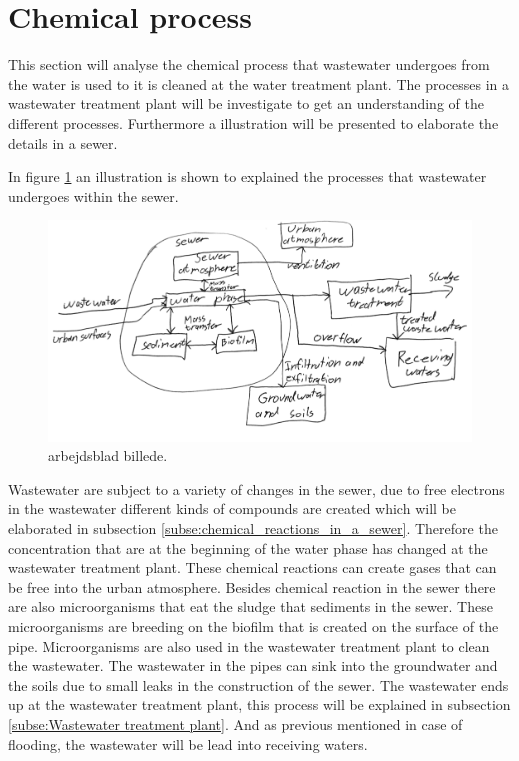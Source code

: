 \section{Chemical process}\label{se:chemical_process}
This section will analyse the chemical process that wastewater undergoes from the water is used to it is cleaned at the water treatment plant. The processes in a wastewater treatment plant will be investigate to get an understanding of the different processes. Furthermore a illustration will be presented to elaborate the details in a sewer. 

In figure \ref{fig:sewer_overview_of_the_different_parts} an illustration is shown to explained the processes that wastewater undergoes within the sewer.
\begin{figure}[H]
\centering
\includegraphics[width=1\textwidth]{report/introduction/pictures/detailed_sewer.pdf}
\caption{arbejdsblad billede. }
\label{fig:sewer_overview_of_the_different_parts}
\end{figure}
Wastewater are subject to a variety of changes in the sewer, due to free electrons in the wastewater different kinds of compounds are created which will be elaborated in subsection \ref{subse:chemical_reactions_in_a_sewer}. Therefore the concentration that are at the beginning of the water phase has changed at the wastewater treatment plant. These chemical reactions can create gases that can be free into the urban atmosphere. Besides chemical reaction in the sewer there are also microorganisms that eat the sludge that sediments in the sewer. These microorganisms are breeding on the biofilm that is created on the surface of the pipe. Microorganisms are also used in the wastewater treatment plant to clean the wastewater. The wastewater in the pipes can sink into the groundwater and the soils due to small leaks in the construction of the sewer. The wastewater ends up at the wastewater treatment plant, this process will be explained in subsection \ref{subse:Wastewater treatment plant}. And as previous mentioned in case of flooding, the wastewater will be lead into receiving waters. 


